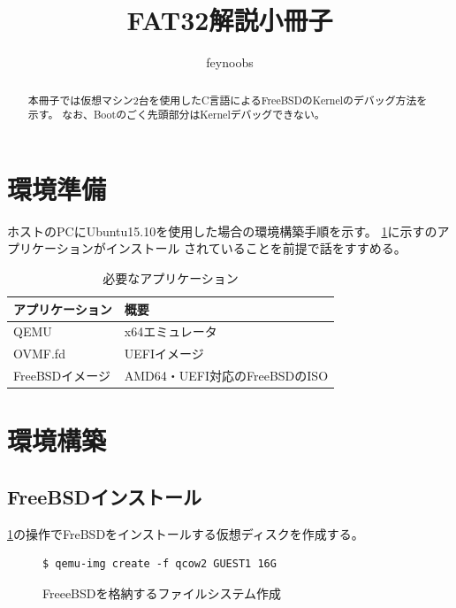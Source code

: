 \documentclass[a4j]{jarticle}
\title{FAT32解説小冊子}
\author{feynoobs}
\begin{document}
\maketitle

\begin{abstract}
本冊子では仮想マシン2台を使用したC言語によるFreeBSDのKernelのデバッグ方法を示す。
なお、Bootのごく先頭部分はKernelデバッグできない。

\end{abstract}
\begin{multicols}{2}

\section{環境準備}
ホストのPCにUbuntu15.10を使用した場合の環境構築手順を示す。
\ref{tb:FreeBSD:_ENV}に示すのアプリケーションがインストール
されていることを前提で話をすすめる。
\begin{table}[htp]
	\caption{必要なアプリケーション}
	\label{tb:FreeBSD:_ENV}
	\begin{center}
		\begin{tabular}{l|p{10cm}}										\hline
			アプリケーション	&	概要							\\	\hline
			QEMU				&	x64エミュレータ				\\	\hline	\hline
			OVMF.fd				&	UEFIイメージ					\\	\hline	\hline
			FreeBSDイメージ		&	AMD64・UEFI対応のFreeBSDのISO	\\	\hline
		\end{tabular}
	\end{center}
\end{table}

\section{環境構築}
\subsection{FreeBSDインストール}
\label{sec:FreeBSD_inst}
\ref{fig:FreeBSD_CREATE}の操作でFreBSDをインストールする仮想ディスクを作成する。
\begin{figure}[htbp]
	\begin{center}
  		\begin{lstlisting}[basicstyle=\ttfamily\footnotesize, frame=single, breaklines=true]
$ qemu-img create -f qcow2 GUEST1 16G
  		\end{lstlisting}
	\end{center}
	\caption{FreeeBSDを格納するファイルシステム作成}
	\label{fig:FreeBSD_CREATE}
\end{figure}


\end{multicols}
\end{document}
